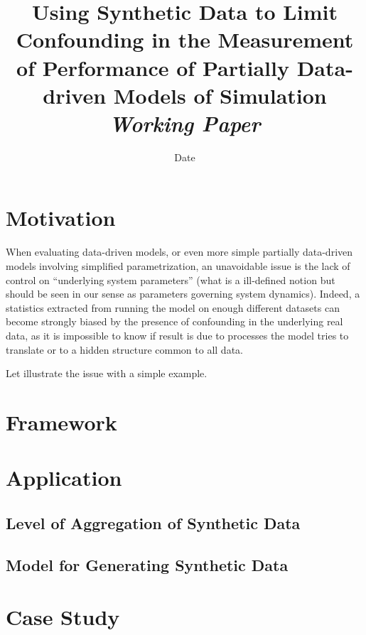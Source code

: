 


\title{Using Synthetic Data to Limit Confounding in the Measurement of Performance of Partially Data-driven Models of Simulation\bigskip\\
\textit{Working Paper}
}
\author{}
\date{Date}


\maketitle

\begin{abstract}

\end{abstract}


\section{Motivation}

When evaluating data-driven models, or even more simple partially data-driven models involving simplified parametrization, an unavoidable issue is the lack of control on ``underlying system parameters'' (what is a ill-defined notion but should be seen in our sense as parameters governing system dynamics). Indeed, a statistics extracted from running the model on enough different datasets can become strongly biased by the presence of confounding in the underlying real data, as it is impossible to know if result is due to processes the model tries to translate or to a hidden structure common to all data.

Let illustrate the issue with a simple example.



\section{Framework}




\section{Application}

\subsection{Level of Aggregation of Synthetic Data}

\subsection{Model for Generating Synthetic Data}




\section{Case Study}









